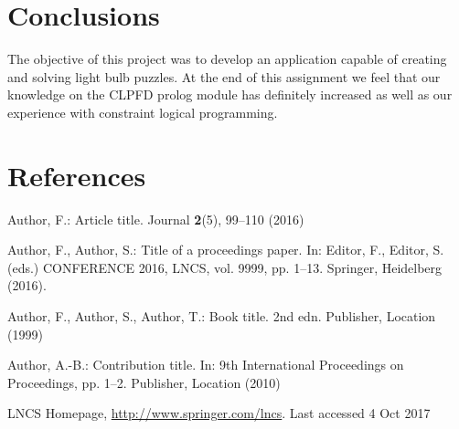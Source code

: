\documentclass[runningheads]{llncs}
\begin{document}
\section{Conclusions}
The objective of this project was to develop an application capable of creating and solving light bulb puzzles. At the end of this assignment we feel that our knowledge on the CLPFD prolog module has definitely increased as well as our experience with constraint logical programming.



\section{References}

%
%
% 
% 
%
\begin{thebibliography}{8}
Author, F.: Article title. Journal \textbf{2}(5), 99--110 (2016)

Author, F., Author, S.: Title of a proceedings paper. In: Editor,
F., Editor, S. (eds.) CONFERENCE 2016, LNCS, vol. 9999, pp. 1--13.
Springer, Heidelberg (2016). 

Author, F., Author, S., Author, T.: Book title. 2nd edn. Publisher,
Location (1999)

Author, A.-B.: Contribution title. In: 9th International Proceedings
on Proceedings, pp. 1--2. Publisher, Location (2010)

LNCS Homepage, \url{http://www.springer.com/lncs}. Last accessed 4
Oct 2017
\end{thebibliography}
\end{document}
